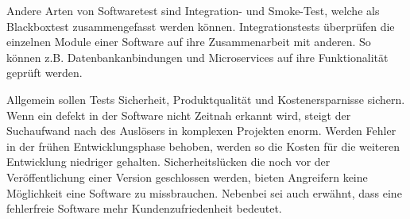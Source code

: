 Andere Arten von Softwaretest sind Integration- und Smoke-Test, welche als Blackboxtest zusammengefasst werden können.
Integrationstests überprüfen die einzelnen Module einer Software auf ihre Zusammenarbeit mit anderen.
So können z.B. Datenbankanbindungen und Microservices auf ihre Funktionalität geprüft werden.\cite{atlassian-testing}

Allgemein sollen Tests Sicherheit, Produktqualität und Kostenersparnisse sichern.
Wenn ein defekt in der Software nicht Zeitnah erkannt wird, steigt der Suchaufwand nach des Auslösers in komplexen Projekten enorm.
Werden Fehler in der frühen Entwicklungsphase behoben, werden so die Kosten für die weiteren Entwicklung niedriger gehalten.
Sicherheitslücken die noch vor der Veröffentlichung einer Version geschlossen werden, bieten Angreifern keine Möglichkeit eine Software zu missbrauchen.
Nebenbei sei auch erwähnt, dass eine fehlerfreie Software mehr Kundenzufriedenheit bedeutet.\cite{stm-testing}
